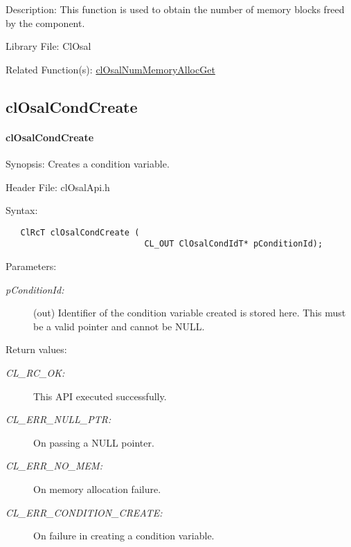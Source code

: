 \begin{Desc}
\item[Description:]This function is used to obtain the number of memory blocks freed by the component.\end{Desc}
\begin{Desc}
\item[Library File:]Cl\-Osal\end{Desc}
\begin{Desc}
\item[Related Function(s):]\hyperlink{pageosal116}{cl\-Osal\-Num\-Memory\-Alloc\-Get} \end{Desc}

\newpage
\subsection{clOsalCondCreate}
\hypertarget{pageosal118}{}\paragraph{cl\-Osal\-Cond\-Create}\label{pageosal118}
\begin{Desc}
\item[Synopsis:]Creates a condition variable.\end{Desc}
\begin{Desc}
\item[Header File:]clOsalApi.h\end{Desc}
\begin{Desc}
\item[Syntax:]

\footnotesize\begin{verbatim}   ClRcT clOsalCondCreate (
                            CL_OUT ClOsalCondIdT* pConditionId);
\end{verbatim}
\normalsize
\end{Desc}
\begin{Desc}
\item[Parameters:]
\begin{description}
\item[{\em p\-Condition\-Id:}](out) Identifier of the condition variable created is stored here. This must be a valid pointer and cannot be NULL.\end{description}
\end{Desc}
\begin{Desc}
\item[Return values:]
\begin{description}
\item[{\em CL\_\-RC\_\-OK:}]This API executed successfully. \item[{\em CL\_\-ERR\_\-NULL\_\-PTR:}]On passing a NULL pointer. \item[{\em CL\_\-ERR\_\-NO\_\-MEM:}]On memory allocation failure. \item[{\em CL\_\-ERR\_\-CONDITION\_\-CREATE:}]On failure in creating a condition variable.\end{description}
\end{Desc}
